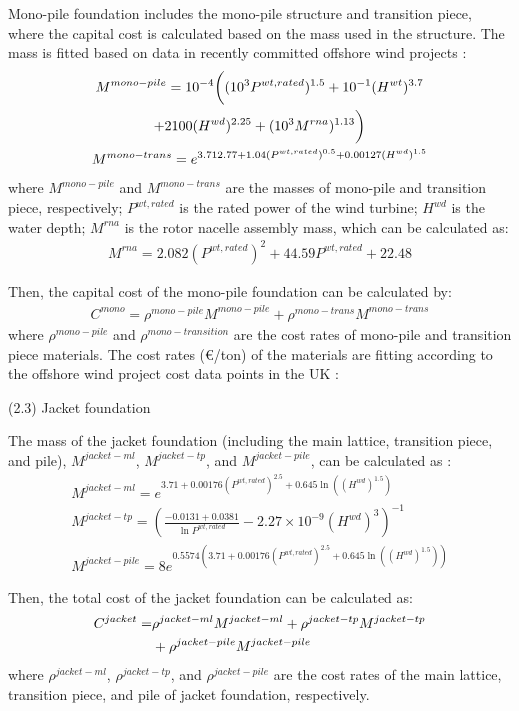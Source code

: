 \documentclass[sn-mathphys,Numbered]{sn-jnl}%
\theoremstyle{thmstyleone}%
\theoremstyle{thmstyletwo}%
\theoremstyle{thmstylethree}%
\begin{document}
Mono-pile foundation includes the mono-pile structure and transition piece, where the capital cost is calculated based on the mass used in the structure. The mass is fitted based on data in recently committed offshore wind projects \cite{NRELOffshoreBalance}:
\begin{gather}
    M^{mono-pile} = 10^{-4} \bigg( (10^3 P^{wt,rated})^{1.5} + 10^{-1}(H^{wt})^{3.7} 
\notag \\
    + 2100(H^{wd})^{2.25} + (10^3 M^{rna})^{1.13} \bigg)
\\
    M^{mono-trans} = e^{3.712.77 + 1.04(P^{wt,rated})^{0.5} + 0.00127(H^{wd})^{1.5}}
\end{gather}
where $M^{mono-pile}$ and $M^{mono-trans}$ are the masses of mono-pile and transition piece, respectively; $P^{wt,rated}$ is the rated power of the wind turbine; $H^{wd}$ is the water depth; $M^{rna}$ is the rotor nacelle assembly mass, which can be calculated as:
\begin{gather}
    M^{rna} = 2.082 (P^{wt,rated})^2 + 44.59 P^{wt,rated} + 22.48
\end{gather}

Then, the capital cost of the mono-pile foundation can be calculated by:
\begin{gather}
    C^{mono} = \rho^{mono-pile} M^{mono-pile} + \rho^{mono-trans} M^{mono-trans}
\end{gather}
where $\rho^{mono-pile}$ and $\rho^{mono-transition}$ are the cost rates of mono-pile and transition piece materials. The cost rates (€/ton) of the materials are fitting according to the offshore wind project cost data points in the UK \cite{Guidetoanoffshorewindfarm}:

(2.3) Jacket foundation

The mass of the jacket foundation (including the main lattice, transition piece, and pile), $M^{jacket-ml}$, $M^{jacket-tp}$, and $M^{jacket-pile}$, can be calculated as \cite{NRELOffshoreBalance}:
\begin{gather}
    M^{jacket-ml} = e^{3.71 + 0.00176(P^{wt,rated})^{2.5} + 0.645\ln \left( {(H^{wd})}^{1.5}\right)}
\\
    M^{jacket-tp} = 
    \left( \frac{-0.0131+0.0381}{\ln{P^{wt,rated}}} -2.27\times 10^{-9} (H^{wd})^3 \right)^{-1} 
\\
    M^{jacket-pile} = 8 e^{0.5574 \left(3.71 + 0.00176(P^{wt,rated})^{2.5} + 0.645\ln \left( {(H^{wd})}^{1.5}\right)\right)}
\end{gather}

Then, the total cost of the jacket foundation can be calculated as:
\begin{align}
    C^{jacket} = & \rho^{jacket-ml} M^{jacket-ml} + \rho^{jacket-tp} M^{jacket-tp} 
    \notag\\
    & + \rho^{jacket-pile} M^{jacket-pile}
\end{align}
where $\rho^{jacket-ml}$, $\rho^{jacket-tp}$, and $\rho^{jacket-pile}$ are the cost rates of the main lattice, transition piece, and pile of jacket foundation, respectively.
\end{document}
